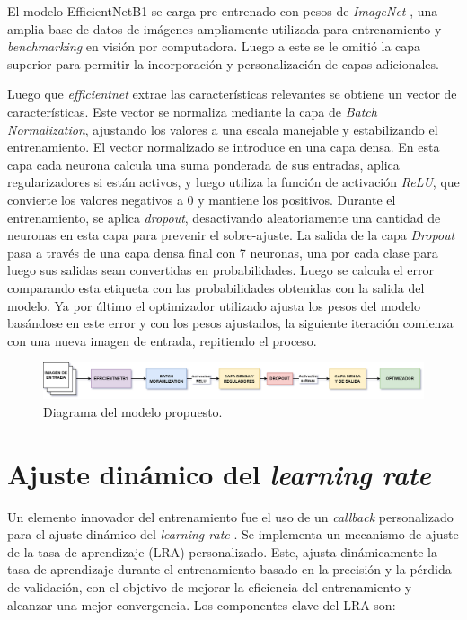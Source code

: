 El modelo EfficientNetB1 se carga pre-entrenado con pesos de \textit{ImageNet} , una amplia base de datos de imágenes ampliamente utilizada para entrenamiento y \textit{benchmarking} en visión por computadora. Luego a este se le omitió la capa superior para permitir la incorporación y personalización de capas adicionales. 

Luego que \textit{efficientnet} extrae las características relevantes se obtiene un vector de características. Este vector se normaliza mediante la capa de \textit{Batch Normalization}, ajustando los valores a una escala manejable y estabilizando el entrenamiento. El vector normalizado se introduce en una capa densa. En esta capa cada neurona calcula una suma ponderada de sus entradas, aplica regularizadores si están activos, y luego utiliza la función de activación \textit{ReLU}, que convierte los valores negativos a 0 y mantiene los positivos. Durante el entrenamiento, se aplica \textit{dropout}, desactivando aleatoriamente una cantidad de neuronas en esta capa para prevenir el sobre-ajuste. La salida de  la capa \textit{Dropout} pasa a través de una capa densa final con 7 neuronas, una por cada clase para luego sus salidas sean convertidas en probabilidades. Luego se calcula el error comparando esta etiqueta con las probabilidades obtenidas con la salida del modelo. Ya por último el optimizador utilizado ajusta los pesos del modelo basándose en este error y con los pesos ajustados, la siguiente iteración comienza con una nueva imagen de entrada, repitiendo el proceso.

\begin{figure}[H]
   \begin{center}
   \includegraphics[width=1\textwidth]{./Graphics/diagrama_modelo.drawio.png}
   \caption{Diagrama del modelo propuesto.}
   \label{fig:model_permormance}
   \end{center}
   \end{figure}

\section{Ajuste dinámico del \textit{learning rate}}

Un elemento innovador del entrenamiento fue el uso de un \textit{callback} personalizado para el ajuste dinámico del \textit{learning rate} . Se implementa un mecanismo de ajuste de la tasa de aprendizaje (LRA) personalizado. Este, ajusta dinámicamente la tasa de aprendizaje durante el entrenamiento basado en la precisión y la pérdida de validación, con el objetivo de mejorar la eficiencia del entrenamiento y alcanzar una mejor convergencia. Los componentes clave del LRA son:

